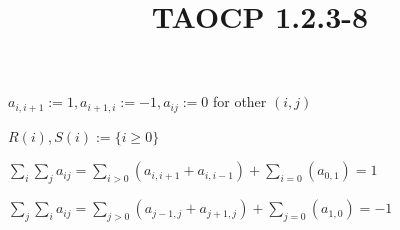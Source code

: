\documentclass{article}
\title{TAOCP 1.2.3\mbox{-}8}
\begin{document}
\maketitle

\( a_{i,i+1} := 1, a_{i+1,i} := -1, a_{ij} := 0 \) for other \( (i,j) \)

\( R(i), S(i) := \{ i \geq 0 \} \)

\( \sum_{i}\sum_{j} a_{ij} = \sum_{i>0}(a_{i,i+1} + a_{i,i-1}) + \sum_{i=0} (a_{0,1}) = 1 \)

\( \sum_{j}\sum_{i} a_{ij} = \sum_{j>0}(a_{j-1,j} + a_{j+1,j}) + \sum_{j=0} (a_{1,0}) = -1 \)
\end{document}
